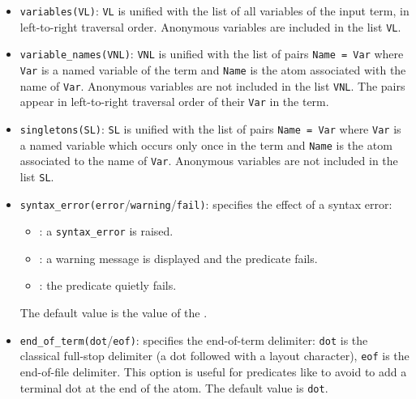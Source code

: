 \begin{itemize}

\item {}\texttt{variables(VL)}: \texttt{VL} is unified with the
list of all variables of the input term, in left-to-right traversal
order. Anonymous variables are included in the list \texttt{VL}.

\item {}\texttt{variable\_names(VNL)}: \texttt{VNL} is
unified with the list of pairs \texttt{Name = Var} where \texttt{Var} is a
named variable of the term and \texttt{Name} is the atom associated with the
name of \texttt{Var}.  Anonymous variables are not included in the list
\texttt{VNL}. The pairs appear in left-to-right traversal order of their 
\texttt{Var} in the term.

\item {}\texttt{singletons(SL)}: \texttt{SL} is unified with the
list of pairs \texttt{Name = Var} where \texttt{Var} is a named variable
which occurs only once in the term and \texttt{Name} is the atom associated
to the name of \texttt{Var}. Anonymous variables are not included in the list
\texttt{SL}.

\item {}\texttt{syntax\_error(error}/\texttt{warning}/\texttt{fail)}:
specifies the effect of a syntax error:

\begin{itemize}

\item {}: a \texttt{syntax\_error} is raised.

\item {}: a warning message is displayed and the predicate
fails.

\item {}: the predicate quietly fails.

\end{itemize}

The default value is the value of the 
 .

\item {}\texttt{end\_of\_term(dot}/\texttt{eof)}: specifies the
end-of-term delimiter: \texttt{dot} is the classical full-stop delimiter (a
dot followed with a layout character), \texttt{eof} is the end-of-file
delimiter. This option is useful for predicates like
  to avoid to add a
terminal dot at the end of the atom. The default value is \texttt{dot}.

\end{itemize}

